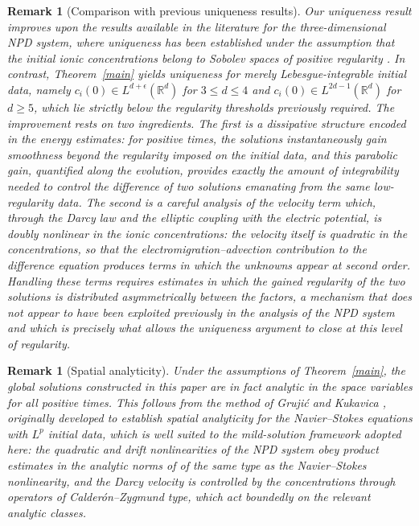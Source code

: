 \documentclass[11pt,reqno]{amsart}
\newtheorem{rem}[thm]{Remark}
\begin{document}
\begin{rem}[Comparison with previous uniqueness results]
\label{rem:comparison}
Our uniqueness result improves upon the results available in the
literature for the three-dimensional NPD system, where uniqueness has
been established under the assumption that the initial ionic
concentrations belong to Sobolev spaces of positive regularity
\cite{ abdo2025long, abdo2026long, ignatova2022global}. In contrast,
Theorem~\ref{main} yields uniqueness for merely
Lebesgue-integrable initial data, namely
$c_i(0) \in L^{d+\epsilon}(\mathbb{R}^d)$ for $3 \le d \le 4$ and
$c_i(0) \in L^{2d-1}(\mathbb{R}^d)$ for $d \ge 5$, which lie strictly
below the regularity thresholds previously required. The improvement
rests on two ingredients. The first is a dissipative structure encoded
in the energy estimates: for positive times, the solutions
instantaneously gain smoothness beyond the regularity imposed on the
initial data, and this parabolic gain, quantified along the evolution,
provides exactly the amount of integrability needed to control the
difference of two solutions emanating from the same low-regularity
data. The second is a careful analysis of the velocity term which,
through the Darcy law and the elliptic coupling with the electric
potential, is doubly nonlinear in the ionic concentrations: the
velocity itself is quadratic in the concentrations, so that the
electromigration--advection contribution to the difference equation
produces terms in which the unknowns appear at second order. Handling
these terms requires estimates in which the gained regularity of the
two solutions is distributed asymmetrically between the factors, a
mechanism that does not appear to have been exploited previously in
the analysis of the NPD system and which is precisely what allows the
uniqueness argument to close at this level of regularity.
\end{rem}

\begin{rem}[Spatial analyticity]
\label{rem:analyticity}
Under the assumptions of Theorem~\ref{main}, the global
solutions constructed in this paper are in fact analytic in the space
variables for all positive times. This follows from the method of
Grujić and Kukavica \cite{grujic1998space}, originally developed to establish spatial
analyticity for the Navier--Stokes equations with $L^p$ initial data,
which is well suited to the mild-solution framework adopted here: the
quadratic and drift nonlinearities of the NPD system obey product
estimates in the analytic norms of of the
same type as the Navier--Stokes nonlinearity, and the Darcy velocity
is controlled by the concentrations through operators of
Calder\'on--Zygmund type, which act boundedly on the relevant analytic
classes. 
\end{rem}
\end{document}
